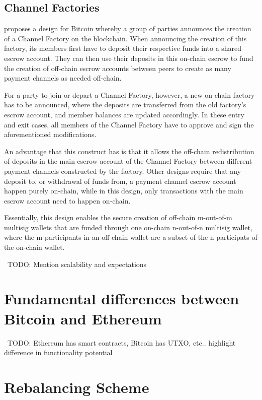 \documentclass[12pt]{article}
\newcommand{\todo}[1]{{\color{red}\ TODO: {#1}}}
\begin{document}
\subsection{Channel Factories}
\cite{scale} proposes a design for Bitcoin whereby a group of parties announces the creation of a Channel Factory on the blockchain. When announcing the creation of this factory, its members first have to deposit their respective funds into a shared escrow account. They can then use their deposits in this on-chain escrow to fund the creation of off-chain escrow accounts between peers to create as many payment channels as needed off-chain.

For a party to join or depart a Channel Factory, however, a new on-chain factory has to be announced, where the deposits are transferred from the old factory's escrow account, and member balances are updated accordingly. In these entry and exit cases, all members of the Channel Factory have to approve and sign the aforementioned modifications.

An advantage that this construct has is that it allows the off-chain redistribution of deposits in the main escrow account of the Channel Factory between different payment channels constructed by the factory. Other designs require that any deposit to, or withdrawal of funds from, a payment channel escrow account happen purely on-chain, while in this design, only transactions with the main escrow account need to happen on-chain.

Essentially, this design enables the secure creation of off-chain m-out-of-m multisig wallets that are funded through one on-chain n-out-of-n multisig wallet, where the m participants in an off-chain wallet are a subset of the n participats of the on-chain wallet.

\todo{Mention scalability and expectations}

\section{Fundamental differences between Bitcoin and Ethereum}
\todo{Ethereum has smart contracts, Bitcoin has UTXO, etc.. highlight difference in functionality potential}

\section{Rebalancing Scheme}
\end{document}
